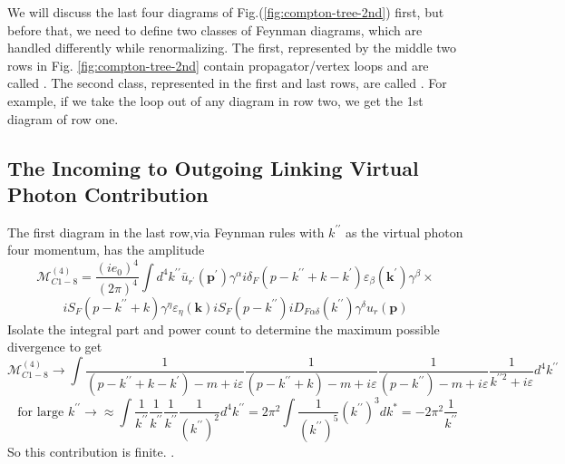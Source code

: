 We will discuss the last four diagrams of Fig.(\ref{fig:compton-tree-2nd}) first, but before that, we need to define two classes of Feynman diagrams, which are handled differently while renormalizing. The first, represented by the middle two rows in Fig. \ref{fig:compton-tree-2nd} contain propagator/vertex loops and are called . The second class, represented in the first and last rows, are called .  For example, if we take the loop out of any diagram in row two, we get the 1st diagram of row one.

\subsection{The Incoming to Outgoing Linking Virtual Photon Contribution}
The first diagram in the last row,via Feynman rules with $k^{\prime \prime}$ as the virtual photon four momentum, has the amplitude
$$\mathcal{M}_{C 1-8}^{(4)}=\frac{\left(i e_{0}\right)^{4}}{(2 \pi)^{4}} \int d^{4} k^{\prime \prime} \bar{u}_{r^{\prime}}\left(\mathbf{p}^{\prime}\right) \gamma^{\alpha} i \delta_{F}\left(p-k^{\prime\prime}+k-k^{\prime}\right) \varepsilon_{\beta}\left(\mathbf{k}^{\prime}\right) \gamma^{\beta} \times$$
$$i S_{F}\left(p-k^{\prime\prime}+k\right) \gamma^{\eta} \varepsilon_{\eta}(\mathbf{k}) i S_{F}\left(p-k^{\prime\prime}\right) i D_{F \alpha \delta}\left(k^{\prime\prime}\right) \gamma^{\delta} u_{r}(\mathbf{p})$$
Isolate the integral part and power count to determine the maximum possible divergence to get
$$
\mathcal{M}_{C1-8}^{(4)}\rightarrow\int \frac{1}{\left(p-k^{\prime\prime}+k-k^{\prime}\right)-m+i \varepsilon} \frac{1}{\left(p-k^{\prime\prime}+k\right)-m+i \varepsilon} \frac{1}{\left(p-k^{\prime\prime}\right)-m+i \varepsilon} \frac{1}{k^{\prime\prime2}+i \varepsilon} d^{4} k^{\prime \prime}$$
$$\text { for large } k^{\prime\prime} \rightarrow \approx \int \frac{1}{k^{\prime\prime}} \frac{1}{k^{\prime\prime}} \frac{1}{k^{\prime\prime}} \frac{1}{\left(k^{\prime\prime}\right)^{2}} d^{4} k^{\prime\prime}=2 \pi^{2} \int \frac{1}{\left(k^{\prime\prime}\right)^{5}}\left(k^{\prime\prime}\right)^{3} d k^{*}=-2 \pi^{2} \frac{1}{k^{\prime \prime}}$$
So this contribution is finite. \textbf{}.
